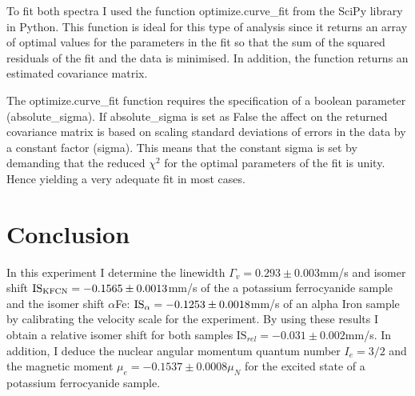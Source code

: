 \documentclass[a4paper, twocolumn]{article}
\begin{document}
To fit both spectra I used the function optimize.curve\_fit from the SciPy library in Python.
This function is ideal for this type of analysis since it returns an array of optimal values for the parameters in the fit so that the sum of the squared residuals of the fit and the data is minimised\cite{15}. In addition, the function returns an estimated covariance matrix.

The optimize.curve\_fit function requires the specification of a boolean parameter (absolute\_sigma). If absolute\_sigma is set as False the affect on the returned covariance matrix is based on scaling standard deviations of errors in the data by a constant factor (sigma). This means that the constant sigma is set by demanding that the reduced $\chi^2$ for the optimal parameters of the fit is unity\cite{15}. Hence yielding a very adequate fit in most cases.

\section{Conclusion}
In this experiment I determine the linewidth $\Gamma_v = 0.293\pm0.003$mm/s and isomer shift $\textrm{IS}_{\rm KFCN} = -0.1565\pm0.0013$mm/s of the a potassium ferrocyanide sample and the isomer shift $\alpha$Fe: $\textrm{IS}_{\rm \alpha} = -0.1253\pm0.0018$mm/s of an alpha Iron sample by calibrating the velocity scale for the experiment. By using these results I obtain a relative isomer shift for both samples $\textrm{IS}_{rel} = -0.031\pm0.002$mm/s.
In addition, I deduce the nuclear angular momentum quantum number $I_e = 3/2$ and the magnetic moment $\mu_e = -0.1537\pm0.0008\mu_N$ for the excited state of a potassium ferrocyanide sample.



\end{document}
